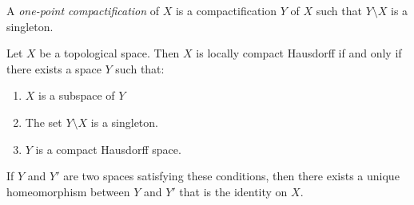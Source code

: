\begin{df}
  A \emph{one-point compactification} of $X$ is a compactification $Y$ of $X$
  such that $Y \setminus X$ is a singleton.
\end{df}

\begin{thm}
  \label{thm:topology:locally_compact:one_point_compactification}
  Let $X$ be a topological space. Then $X$ is locally compact Hausdorff if
  and
  only if there exists a space $Y$ such that:
  \begin{enumerate}
    \item $X$ is a subspace of $Y$
    \item The set $Y \setminus X$ is a singleton.
    \item $Y$ is a compact Hausdorff space.
  \end{enumerate}
  If $Y$ and $Y'$ are two spaces satisfying these conditions, then there
  exists a
  unique homeomorphism between $Y$ and $Y'$ that is the identity on $X$.
\end{thm}

